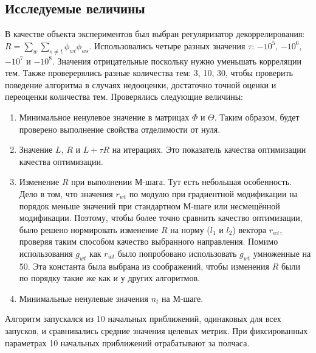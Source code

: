 \documentclass[12pt]{article}
\begin{document}
\subsection{Исследуемые величины}
В качестве объекта экспериментов был выбран регуляризатор декоррелирования: $R = \sum_w \sum_{s \neq t} \phi_{wt} \phi_{ws}$. Использовались четыре разных значения $\tau$: $-10^5$, $-10^6$, $-10^7$ и $-10^8$. Значения отрицательные поскольку нужно уменьшать корреляции тем. Также проверерялись разные количества тем: 3, 10, 30, чтобы проверить поведение алгоритма в случаях недооценки, достаточно точной оценки и переоценки  количества тем. Проверялись следующие величины:
\begin{enumerate}
\item Минимальное ненулевое значение в матрицах $\Phi$ и $\Theta$. Таким образом, будет проверено выполнение свойства отделимости от нуля.
\item Значение $L$, $R$ и $L + \tau R$ на итерациях. Это показатель качества оптимизации качества оптимизации.
\item Изменение $R$ при выполнении М-шага. Тут есть  небольшая особенность. Дело в том, что значения $r_{wt}$ по модулю  при градиентной модификации на порядок меньше значений при стандартном М-шаге или несмещённой модификации. Поэтому, чтобы более точно сравнить качество оптимизации,  было решено нормировать изменение $R$ на норму ($l_1$ и $l_2$) вектора $r_{wt}$, проверяя таким способом качество выбранного направления. Помимо использования $g_{wt}$ как $r_{wt}$ было попробовано использовать $g_{wt}$ умноженные на 50. Эта константа была выбрана из соображений, чтобы изменения $R$ были по порядку такие же как и у других алгоритмов.
\item Минимальные ненулевые значения $n_t$  на М-шаге.
\end{enumerate}
Алгоритм  запускался из 10 начальных приближений, одинаковых для всех запусков, и сравнивались средние значения целевых метрик. При фиксированных параметрах 10 начальных приближений отрабатывают за полчаса.
\end{document}
